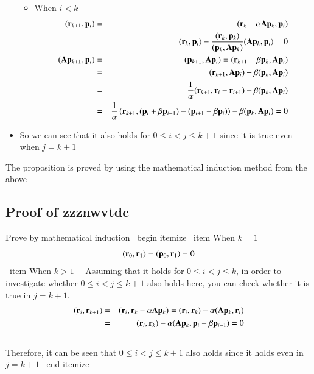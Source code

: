\begin{itemize}
\begin {itemize}
\item When $i<k$ \ \
\begin{eqnarray}
(\mathbf{r}_{k+1},\mathbf{p}_i)
&=&  (\mathbf{r}_k-\alpha\mathbf{A}\mathbf{p}_k,\mathbf{p}_i)\\
&=& (\mathbf{r}_k,\mathbf{p}_i)-\frac{(\mathbf{r}_k,\mathbf{p}_k)}{(\mathbf{p}_k,\mathbf{A}\mathbf{p}_k)}(\mathbf{A}\mathbf{p}_k,\mathbf{p}_i)=0\\
(\mathbf{A}\mathbf{p}_{k+1},\mathbf{p}_i)
&=&  (\mathbf{p}_{k+1},\mathbf{A}\mathbf{p}_i)  =  (\mathbf{r}_{k+1}-\beta\mathbf{p}_k,\mathbf{A}\mathbf{p}_i)  \\
&=&  (\mathbf{r}_{k+1},\mathbf{A}\mathbf{p}_i)-\beta(\mathbf{p}_k,\mathbf{A}\mathbf{p}_i)\\
&=&   \frac{1}{\alpha}(\mathbf{r}_{k+1},\mathbf{r}_i-\mathbf{r}_{i+1})-\beta(\mathbf{p}_k,\mathbf{A}\mathbf{p}_i)\\
&=&  \frac{1}{\alpha}\left(\mathbf{r}_{k+1},(\mathbf{p}_i+\beta\mathbf{p}_{i-1})-(\mathbf{p}_{i+1}+\beta\mathbf{p}_i)\right)-\beta(\mathbf{p}_k,\mathbf{A}\mathbf{p}_i)=0
\end{eqnarray}
\end {itemize}

\item So we can see that it also holds for $0\le{i}<{j}\le{k+1}$ since it is true even when $j=k+1$
\end {itemize}

The proposition is proved by using the mathematical induction method from the above



\subsection{Proof of zzznwvtdc}


Prove by mathematical induction
\ begin {itemize}
\ item When $k=1$ \\
\begin{equation}
(\mathbf{r}_0,\mathbf{r}_1)=(\mathbf{p}_0,\mathbf{r}_1)=0
\end{equation}
\ item When $k>1$ \ \
Assuming that it holds for $0\le{i}<{j}\le{k}$, in order to investigate whether $0\le{i}<{j}\le{k+1}$ also holds here, you can check whether it is true in $j=k+1$. \\
\begin{eqnarray}
(\mathbf{r}_i,\mathbf{r}_{k+1})
&=&  (\mathbf{r}_i,\mathbf{r}_k-\alpha\mathbf{A}\mathbf{p}_k)  =  (\mathbf{r}_i,\mathbf{r}_k)-\alpha(\mathbf{A}\mathbf{p}_k,\mathbf{r}_i)\\
&=&  (\mathbf{r}_i,\mathbf{r}_k)-\alpha(\mathbf{A}\mathbf{p}_k,\mathbf{p}_i+\beta\mathbf{p}_{i-1})  =  0
\end{eqnarray}\\
Therefore, it can be seen that $0\le{i}<{j}\le{k+1}$ also holds since it holds even in $j=k+1$
\ end {itemize}

